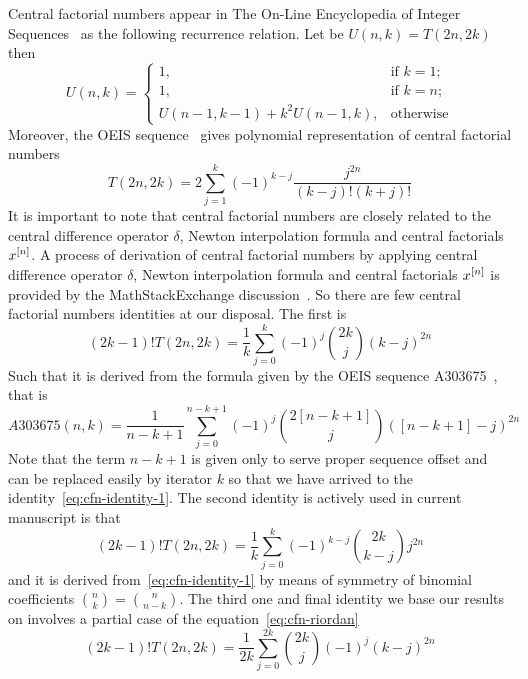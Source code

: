 Central factorial numbers appear in The On-Line Encyclopedia of Integer Sequences~\cite{sloane2000centralfactorial}
as the following recurrence relation.
Let be $U(n,k) = T(2n, 2k)$ then
\begin{equation*}
    U(n,k) = \begin{cases}
        1, & \text{if } k=1; \\
        1, & \text{if } k=n; \\
        U(n-1, k-1) + k^2 U(n-1, k), & \text{otherwise}
    \end{cases}
\end{equation*}
Moreover, the OEIS sequence~\cite{sloane2000triangle} gives polynomial representation of central factorial numbers
\begin{equation*}
    T(2n,2k) = 2 \sum_{j=1}^{k} (-1)^{k-j} \frac{j^{2n}}{(k-j)! (k+j)!}
\end{equation*}
It is important to note that central factorial numbers are closely related to the central difference operator $\delta$,
Newton interpolation formula and central factorials $x^{[n]}$.
A process of derivation of central factorial numbers by applying central difference operator $\delta$,
Newton interpolation formula and central factorials $x^{[n]}$
is provided by the MathStackExchange discussion~\cite{scheuer2020mathstackexchange}.
So there are few central factorial numbers identities at our disposal.
The first is
\begin{equation}
(2k-1)
    !T(2n,2k) = \frac{1}{k} \sum_{j=0}^{k} (-1)^j \binom{2k}{j} (k-j)^{2n}\label{eq:cfn-identity-1}
\end{equation}
Such that it is derived from the formula given by the OEIS sequence A303675~\cite{kolosov2018coefficients}, that is
\begin{equation*}
    A303675(n,k) = \frac{1}{n-k+1} \sum_{j=0}^{n-k+1} (-1)^{j} \binom{2[n-k+1]}{j} ([n-k+1]-j)^{2n}
\end{equation*}
Note that the term $n-k+1$ is given only to serve proper sequence offset and can be replaced easily by iterator $k$
so that we have arrived to the identity~\eqref{eq:cfn-identity-1}.
The second identity is actively used in current manuscript is that
\begin{equation}
(2k-1)
    !T(2n,2k) = \frac{1}{k} \sum_{j=0}^{k} (-1)^{k-j} \binom{2k}{k-j} j^{2n}\label{eq:cfn-identity-2}
\end{equation}
and it is derived from~\eqref{eq:cfn-identity-1} by means
of symmetry of binomial coefficients $\binom{n}{k} = \binom{n}{n-k}$.
The third one and final identity we base our results on involves a partial case of the equation~\eqref{eq:cfn-riordan}
\begin{equation}
(2k-1)
    !T(2n, 2k) = \frac{1}{2k} \sum_{j=0}^{2k} \binom{2k}{j} (-1)^{j} (k-j)^{2n}\label{eq:cfn-identity-3}
\end{equation}

